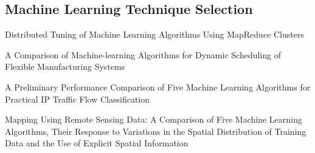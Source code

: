 \subsection{Machine Learning Technique Selection}
\begin{description}
  \item{Distributed Tuning of Machine Learning Algorithms Using MapReduce Clusters} \cite{ML:MapReduceClusters}
  \item{A Comparison of Machine-learning Algorithms for Dynamic Scheduling of Flexible Manufacturing Systems} \cite{ML:ManufacturingSystems}
  \item{A Preliminary Performance Comparison of Five Machine Learning Algorithms for Practical IP Traffic Flow Classification} \cite{ML:IPTraffic}
  \item{ Mapping Using Remote Sensing Data: A Comparison of Five Machine Learning Algorithms, Their Response to Variations in the Spatial Distribution of Training Data and the Use of Explicit Spatial Information} \cite{ML:GeoMapping}
\end{description}
